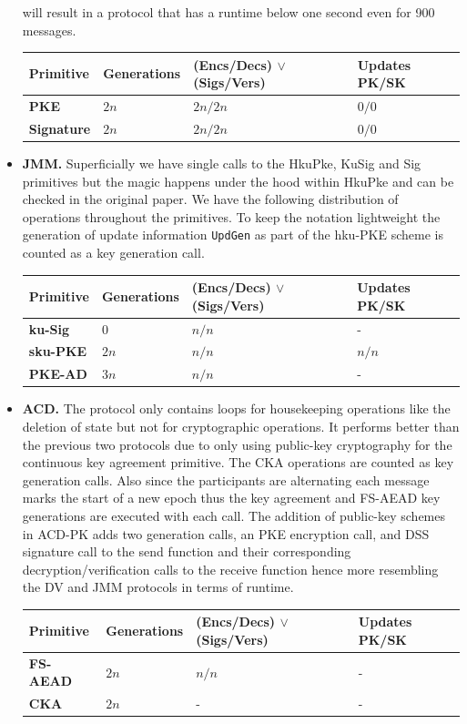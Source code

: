 \documentclass[11pt,a4paper,twoside,openright,bibliography=totoc]{scrbook}
\begin{document}
\begin{itemize}
  will result in a protocol that has a runtime below one second
  even for 900 messages.
  \begin{center}
    \begin{tabular}{ | l | l | l | l |}
    \hline
    Primitive & Generations & (Encs/Decs) $\vee$ (Sigs/Vers) & Updates PK/SK \\ \hline
    \textbf{PKE} & $2n$ & $2n/2n$ & $0/0$ \\ \hline
    \textbf{Signature} & $2n$ & $2n/2n$ & $0/0$ \\  
    \hline
    \end{tabular}
  \end{center}
\item \textbf{JMM.} Superficially we have single calls to the HkuPke, KuSig and
  Sig primitives but the magic happens under the hood within HkuPke and can
  be checked in the original paper. We have the following distribution
  of operations throughout the primitives. To keep the notation lightweight
  the generation of update information \texttt{UpdGen} as part
  of the hku-PKE scheme is counted as a key generation call.
  \begin{center}
    \begin{tabular}{ | l | l | l | l |}
    \hline
    Primitive & Generations & (Encs/Decs) $\vee$ (Sigs/Vers) & Updates PK/SK \\ \hline
    \textbf{ku-Sig} & $0$ & $n/n$ & - \\ \hline
    \textbf{sku-PKE} & $2n$ & $n/n$ & $n/n$ \\ \hline
    \textbf{PKE-AD} & $3n$ & $n/n$ & - \\
    \hline
    \end{tabular}
  \end{center}
\item \textbf{ACD.} The protocol only contains loops for housekeeping operations
  like the deletion of state but not for cryptographic operations. It performs
  better than the previous two protocols due to only using public-key cryptography
  for the continuous key agreement primitive. The CKA operations are counted
  as key generation calls. Also since the participants are alternating
  each message marks the start of a new epoch thus the key agreement and
  FS-AEAD key generations are executed with each call. The addition
  of public-key schemes in ACD-PK adds two generation calls, an PKE encryption call,
  and DSS signature call to the send function and their corresponding
  decryption/verification calls to the receive function hence more
  resembling the DV and JMM protocols in terms of runtime.
  \begin{center}
    \begin{tabular}{ | l | l | l | l |}
    \hline
    Primitive & Generations & (Encs/Decs) $\vee$ (Sigs/Vers) & Updates PK/SK \\ \hline
    \textbf{FS-AEAD} & $2n$ & $n/n$ & - \\ \hline
    \textbf{CKA} & $2n$ & - & - \\  
    \hline
    \end{tabular}
  \end{center}
\end{itemize}
\end{document}
